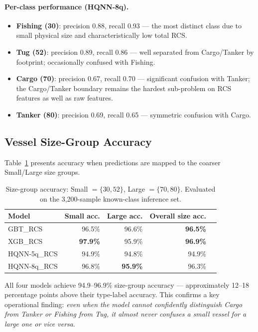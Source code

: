 \documentclass[journal]{IEEEtran}
\begin{document}
\paragraph{Per-class performance (HQNN-8q).}
\begin{itemize}
  \item \textbf{Fishing (30)}: precision 0.88, recall 0.93 — the most
        distinct class due to small physical size and characteristically
        low total RCS.
  \item \textbf{Tug (52)}: precision 0.89, recall 0.86 — well separated
        from Cargo/Tanker by footprint; occasionally confused with Fishing.
  \item \textbf{Cargo (70)}: precision 0.67, recall 0.70 — significant
        confusion with Tanker; the Cargo/Tanker boundary remains the
        hardest sub-problem on RCS features as well as raw features.
  \item \textbf{Tanker (80)}: precision 0.69, recall 0.65 — symmetric
        confusion with Cargo.
\end{itemize}

\subsection{Vessel Size-Group Accuracy}
\label{sec:size_results}

Table~\ref{tab:size_results} presents accuracy when predictions are
mapped to the coarser Small/Large size groups.

\begin{table}[H]
\centering
\caption{Size-group accuracy: Small $= \{30, 52\}$, Large $= \{70, 80\}$.
         Evaluated on the 3,200-sample known-class inference set.}
\label{tab:size_results}
\begin{tabular}{lrrrr}
\toprule
\textbf{Model} & \textbf{Small acc.} & \textbf{Large acc.} & \textbf{Overall size acc.} \\
\midrule
GBT\_RCS      & 96.5\% & 96.6\% & \textbf{96.5\%} \\
XGB\_RCS      & \textbf{97.9\%} & 95.9\% & \textbf{96.9\%} \\
HQNN-5q\_RCS  & 94.9\% & 94.8\% & 94.9\% \\
HQNN-8q\_RCS  & 96.8\% & \textbf{95.9\%} & 96.3\% \\
\bottomrule
\end{tabular}
\end{table}

All four models achieve 94.9--96.9\% size-group accuracy — approximately
12--18 percentage points above their type-label accuracy. This confirms
a key operational finding: \emph{even when the model cannot confidently
distinguish Cargo from Tanker or Fishing from Tug, it almost never
confuses a small vessel for a large one or vice versa}.
\end{document}
